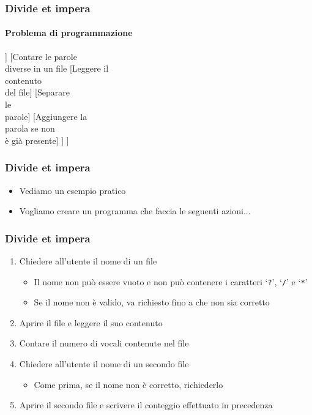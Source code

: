 \begin{contentframe}
    \frametitle{Divide et impera}
    \framesubtitle{Problema di programmazione}

    \centering
    \smartarttree[
        Contare il numero di parole diverse\\presenti in tutti i file del computer 
        [Cercare tutti i\\file del computer
            [Cercare\\nella cartella\\corrente]
            [Cercare\\nelle\\sottocartelle]
        ]
        [Contare le parole\\diverse in un file
            [Leggere il\\contenuto\\del file]
            [Separare\\le\\parole]
            [Aggiungere la\\parola se non\\è già presente]
        ]
    ]
\end{contentframe}

\begin{exampleframe}
    \frametitle{Divide et impera}

    \begin{itemize}
        \item Vediamo un esempio pratico
        \bigskip
        \item Vogliamo creare un programma che faccia le seguenti azioni...
    \end{itemize}
\end{exampleframe}

\begin{exampleframe}
    \frametitle{Divide et impera}

    \begin{enumerate}
        \item Chiedere all’utente il nome di un file
        \begin{itemize}
            \item Il nome non può essere vuoto e non può contenere i caratteri `\texttt{?}', `\texttt{/}' e `\texttt{*}'
            \item Se il nome non è valido, va richiesto fino a che non sia corretto
        \end{itemize}
        \item Aprire il file e leggere il suo contenuto
        \item Contare il numero di vocali contenute nel file
        \item Chiedere all’utente il nome di un secondo file
        \begin{itemize}
            \item Come prima, se il nome non è corretto, richiederlo
        \end{itemize}
        \item Aprire il secondo file e scrivere il conteggio effettuato in precedenza
    \end{enumerate}
\end{exampleframe}

